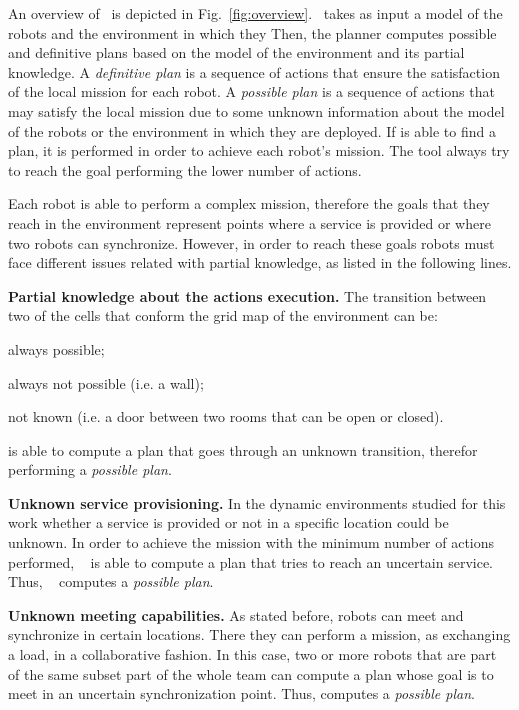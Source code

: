 
An overview of \toolName\ is depicted in Fig.~\ref{fig:overview}.
\toolName\ takes as input a model of the robots and the environment in which they
Then, the planner computes possible and definitive plans based on the model of the environment and its partial knowledge.
A \emph{definitive plan} is a sequence of actions that ensure the satisfaction of the local mission for each robot. 
A \emph{possible plan} is a sequence of actions that may satisfy the local mission due to some unknown information about the model of the robots or the environment in which they are deployed. 
If \toolName is able to find a plan, it is performed in order to achieve each robot's mission.
The tool always try to reach the goal performing the lower number of actions.

Each robot is able to perform a complex mission, therefore the goals that they reach in the environment represent points where a service is provided or where two robots can synchronize.
However, in order to reach these goals robots must face different issues related with partial knowledge, as listed in the following lines.

\textbf{Partial knowledge about the actions execution.} 
The transition between two of the cells that conform the grid map of the environment can be:
\begin{enumerate*}
\item always possible;
\item always not possible (i.e. a wall);
\item not known (i.e. a door between two rooms that can be open or closed).
\end{enumerate*}
\toolName is able to compute a plan that goes through an unknown transition, therefor performing a \emph{possible plan}.

\textbf{Unknown service provisioning.} 
In the dynamic environments studied for this work whether a service is provided or not in a specific location could be unknown. 
In order to achieve the mission with the minimum number of actions performed, \toolName~ is able to compute a plan that tries to reach an uncertain service.
Thus, \toolName~ computes a \emph{possible plan}.

\textbf{Unknown meeting capabilities.} 
As stated before, robots can meet and synchronize in certain locations.
There they can perform a mission, as exchanging a load, in a collaborative fashion.
In this case, two or more robots that are part of the same subset part of the whole team can compute a plan whose goal is to meet in an uncertain synchronization point.
Thus, \toolName computes a \emph{possible plan}.

